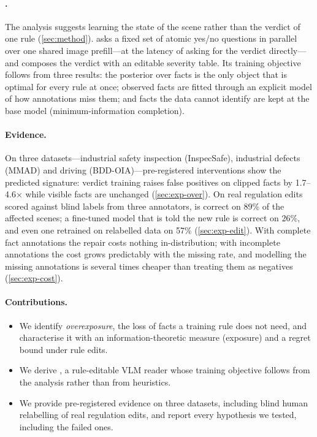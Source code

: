 \paragraph{\lux.} The analysis suggests learning the state of the scene rather than the verdict of one rule (\cref{sec:method}). \lux asks a fixed set of atomic yes/no questions in parallel over one shared image prefill---at the latency of asking for the verdict directly---and composes the verdict with an editable severity table. Its training objective follows from three results: the posterior over facts is the only object that is optimal for every rule at once; observed facts are fitted through an explicit model of how annotations miss them; and facts the data cannot identify are kept at the base model (minimum-information completion).

\paragraph{Evidence.} On three datasets---industrial safety inspection (InspecSafe), industrial defects (MMAD) and driving (BDD-OIA)---pre-registered interventions show the predicted signature: verdict training raises false positives on clipped facts by 1.7--4.6$\times$ while visible facts are unchanged (\cref{sec:exp-over}). On real regulation edits scored against blind labels from three annotators, \lux is correct on 89\% of the affected scenes; a fine-tuned model that is told the new rule is correct on 26\%, and even one retrained on relabelled data on 57\% (\cref{sec:exp-edit}). With complete fact annotations the repair costs nothing in-distribution; with incomplete annotations the cost grows predictably with the missing rate, and modelling the missing annotations is several times cheaper than treating them as negatives (\cref{sec:exp-cost}).

\paragraph{Contributions.}
\begin{itemize}
\item We identify \emph{overexposure}, the loss of facts a training rule does not need, and characterise it with an information-theoretic measure (exposure) and a regret bound under rule edits.
\item We derive \lux, a rule-editable VLM reader whose training objective follows from the analysis rather than from heuristics.
\item We provide pre-registered evidence on three datasets, including blind human relabelling of real regulation edits, and report every hypothesis we tested, including the failed ones.
\end{itemize}

